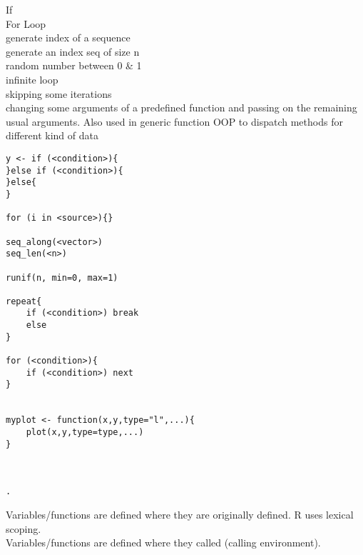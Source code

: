 \documentclass[12pt,a4paper]{report}
\begin{document}
\begin{tcolorbox}[colback=pageyl,colframe=pagebl,title= R \hfill If While repeat next break return,coltitle=Magenta,fonttitle=\bfseries,coltext=Black,width=0.9\paperwidth,boxrule=2mm]\colorbox{pageyl}{\noindent\begin{minipage}[t]{0.3\textwidth}\sffamily \color{ctnb}\vspace{\baselineskip}
If\\[4\baselineskip]
For Loop\\[\baselineskip]
generate index of a sequence\\
generate an index seq of size n\\[\baselineskip]
random number between 0 \& 1\\[\baselineskip]
infinite loop\\[4\baselineskip]
skipping some iterations\\[3\baselineskip]
changing some arguments of a predefined function and passing on the remaining usual arguments. Also used in generic function OOP to dispatch methods for different kind of data
\end{minipage}}\qquad\begin{minipage}[t]{0.672\textwidth}
{\begin{lstlisting}[frame=single,framerule=0pt, numbers=none, numbersep=10pt, aboveskip=20pt,belowskip=20pt]
y <- if (<condition>){
}else if (<condition>){
}else{
}

for (i in <source>){}

seq_along(<vector>)
seq_len(<n>)

runif(n, min=0, max=1)

repeat{
	if (<condition>) break
	else 
}

for (<condition>){
	if (<condition>) next
}


myplot <- function(x,y,type="l",...){
	plot(x,y,type=type,...)
}



.
\end{lstlisting}}\end{minipage}\end{tcolorbox}


\vspace{\baselineskip}
 Variables/functions are defined where they are originally defined. R uses lexical scoping.\\
 Variables/functions are defined where they called (calling environment).\\
\end{document}
